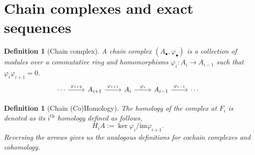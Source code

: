 \documentclass[12pt]{report}
\numberwithin{equation}{section}
\newcounter{dummy} \numberwithin{dummy}{section}
\newtheorem{theorem}[dummy]{Theorem}
\newtheorem{definition}[dummy]{Definition}
\begin{document}
%	
%
%
%	
%	
%	
	\section{Chain complexes and exact sequences}
	
	
	\begin{definition}[Chain complex]
		A {chain complex} $(A_\bullet, \varphi_\bullet)$ is a collection of modules over a commutative ring and homomorphisms $\varphi_i: A_i \to A_{i-1}$ such that $\varphi_i \varphi_{i+1}=0$.
		\[\begin{tikzcd}
			\cdots & {A_{i+1}} & {A_i} & {A_{i-1}} & \cdots
			\arrow["{\varphi_{i+1}}", from=1-2, to=1-3]
			\arrow["{\varphi_i}", from=1-3, to=1-4]
			\arrow["{\varphi_{i-1}}", from=1-4, to=1-5]
			\arrow["{\varphi_{i+2}}", from=1-1, to=1-2]
		\end{tikzcd}\]
	\end{definition}
	\begin{definition}[Chain (Co)Homology]
		The {homology} of the complex at $F_i$ is denoted as its $i^{\mathrm{th}}$ homology defined as follows,
		\[ H_iA := \ker \varphi_i/ \mathrm{im} \varphi_{i+1}. \]
		Reversing the arrows gives us the analogous definitions for cochain complexes and cohomology.
	\end{definition}
	
\end{document}
